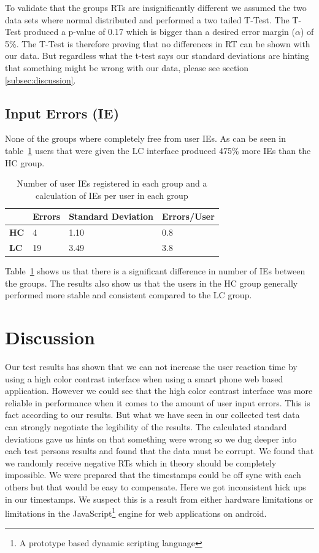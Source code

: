 \documentclass[runningheads,a4paper]{llncs}
\begin{document}
To validate that the groups RTs are insignificantly different we assumed the two data sets where normal distributed and performed a two tailed T-Test. The T-Test produced a p-value of 0.17 which is bigger than a desired error margin ($\alpha$) of 5\%. The T-Test is therefore proving that no differences in RT can be shown with our data. But regardless what the t-test says our standard deviations are hinting that something might be wrong with our data, please see section \ref{subsec:discussion}.

\subsection{Input Errors (IE)}
None of the groups where completely free from user IEs. As can be seen in table~\ref{tab:userIE} users that were given the LC interface produced 475\% more IEs than the HC group.

\begin{table}[]
	\centering
	\label{tab:userIE}
	\setlength{\tabcolsep}{1em}
	\setlength\extrarowheight{1em}
	\begin{tabular}{l|l|l|l}
		\textbf{} & \textbf{Errors} & \textbf{Standard Deviation} & \textbf{Errors/User} \\ \hline
		\textbf{HC} & 4 & 1.10 & 0.8 \\ \hline
		\textbf{LC} & 19 & 3.49 & 3.8
	\end{tabular}
	\caption{Number of user IEs registered in each group and a calculation of IEs per user in each group}
\end{table}

Table~\ref{tab:userIE} shows us that there is a significant difference in number of IEs between the groups. The results also show us that the users in the HC group generally performed more stable and consistent compared to the LC group.

\section{Discussion}\label{sec:discussion}
Our test results has shown that we can not increase the user reaction time by using a high color contrast interface when using a smart phone web based application. However we could see that the high color contrast interface was more reliable in performance when it comes to the amount of user input errors. This is fact according to our results. But what we have seen in our collected test data can strongly negotiate the legibility of the results. The calculated standard deviations gave us hints on that something were wrong so we dug deeper into each test persons results and found that the data must be corrupt. We found that we randomly receive negative RTs which in theory should be completely impossible. We were prepared that the timestamps could be off sync with each others but that would be easy to compensate. Here we got inconsistent hick ups in our timestamps. We suspect this is a result from either hardware limitations or limitations in the JavaScript\footnote{A prototype based dynamic scripting language} engine for web applications on android.
\end{document}
